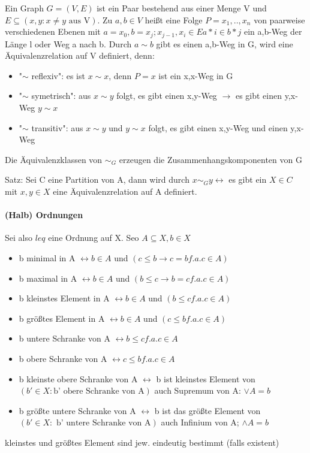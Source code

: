 \documentclass[10pt,landscape]{article}
\begin{document}
\begin{multicols}{3}
Ein Graph $G=(V,E)$ ist ein Paar bestehend aus einer Menge V und $E\subseteq (x,y: x \not = y \text{ aus V} )$.
Zu $a,b\in V$ heißt eine Folge $P=x_1,..,x_n$ von paarweise verschiedenen Ebenen mit $a=x_0, b=x_j; x_{j-1},x_i \in E{a*i \in b*j}$ ein a,b-Weg der Länge l oder Weg a nach b. Durch $a\sim b$ gibt es einen a,b-Weg in G, wird eine Äquivalenzrelation auf V definiert, denn:
\begin{itemize}
    \item "$\sim$ reflexiv": es ist $x\sim x$, denn $P=x$ ist ein x,x-Weg in G
    \item "$\sim$ symetrisch": aus $x\sim y$ folgt, es gibt einen x,y-Weg $\rightarrow$ es gibt einen y,x-Weg $y\sim x$
    \item "$\sim$ transitiv": aus $x\sim y$ und $y\sim x$ folgt, es gibt einen x,y-Weg und einen y,x-Weg
\end{itemize}
Die Äquivalenzklassen von $\sim _G$ erzeugen die Zusammenhangskomponenten von G

Satz: Sei C eine Partition von A, dann wird durch $x\sim _G y \leftrightarrow$ es gibt ein $X\in C$ mit $x,y\in X$ eine Äquivalenzrelation auf A definiert.

\paragraph{(Halb) Ordnungen}
Sei also $leq$ eine Ordnung auf X. Seo $A\subseteq X, b\in X$
\begin{itemize}
    \item b minimal in A $\leftrightarrow b\in A$ und $(c\leq b \rightarrow c=b f.a. c\in A)$
    \item b maximal in A $\leftrightarrow b\in A$ und $(b\leq c \rightarrow b=c f.a. c\in A)$
    \item b kleinstes Element in A $\leftrightarrow b\in A$ und $(b\leq c f.a. c\in A)$
    \item b größtes Element in A $\leftrightarrow b\in A$ und $(c\leq b f.a. c\in A)$
    \item b untere Schranke von A $\leftrightarrow b\leq c f.a. c\in A$
    \item b obere Schranke von A $\leftrightarrow c\leq b f.a. c\in A$
    \item b kleinste obere Schranke von A $\leftrightarrow$ b ist kleinstes Element von $(b'\in X: \text{b' obere Schranke von A})$ auch Supremum von A: $\lor A = b$
    \item b größte untere Schranke von A $\leftrightarrow$ b ist das größte Element von $(b'\in X: \text{ b' untere Schranke von A} )$ auch Infinium von A; $\land A = b$
\end{itemize}
kleinstes und größtes Element sind jew. eindeutig bestimmt (falls existent)


\end{multicols}
\end{document}
